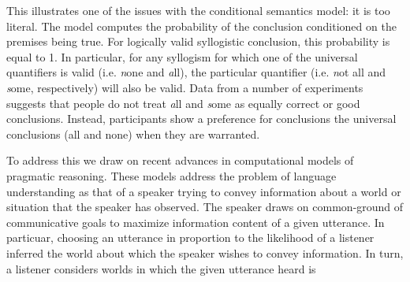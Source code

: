 \documentclass[10pt,letterpaper]{article}
\begin{document}
This illustrates one of the issues with the conditional semantics model: it is too literal. The model computes the probability of the conclusion conditioned on the premises being true. For logically valid syllogistic conclusion, this probability is equal to 1. In particular, for any syllogism for which one of the universal quantifiers is valid (i.e. {\emph none} and {\emph all}), the particular quantifier (i.e. {\emph not all} and {\emph some}, respectively) will also be valid. Data from a number of experiments suggests that people do not treat {\emph all} and {\emph some} as equally correct or good conclusions. Instead, participants show a preference for conclusions the universal conclusions (all and none) when they are warranted. 

To address this we draw on recent advances in computational models of pragmatic reasoning. These models address the problem of language understanding as that of a speaker trying to convey information about a world or situation that the speaker has observed. The speaker draws on common-ground of communicative goals to maximize information content of a given utterance. In particuar, choosing an utterance in proportion to the likelihood of a listener inferred the world about which the speaker wishes to convey information. In turn, a listener considers worlds in which the given utterance heard is 
%
%
\end{document}
